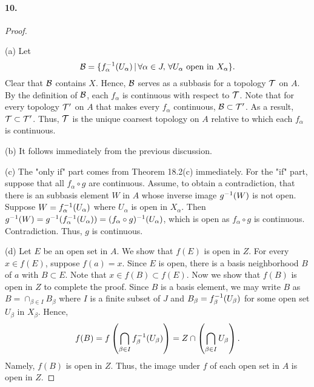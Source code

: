   \paragraph{10.}
  \begin{proof}
    $\,$\par
    (a) Let
    \[
      \mathcal{B}=\{f_\alpha^{-1}(U_\alpha) \,|\, \forall\alpha\in J,\,\forall
      U_\alpha\text{ open in $X_\alpha$}\}.
    \]
    Clear that $\mathcal{B}$ contains $X$. Hence, $\mathcal{B}$ serves as a subbasis
    for a topology $\mathcal{T}$ on $A$. By the definition of $\mathcal{B}$, each
    $f_\alpha$ is continuous with respect to $\mathcal{T}$. Note that for every
    topology $\mathcal{T}^\prime$ on $A$ that makes every $f_\alpha$ continuous, 
    $\mathcal{B}\subset\mathcal{T}^\prime$. As a result, $\mathcal{T}\subset\mathcal{T}^\prime$.
    Thus, $\mathcal{T}$ is the unique coarsest topology on $A$ relative to which
    each $f_\alpha$ is continuous.\par
    (b) It follows immediately from the previous discussion.\par
    (c) The "only if" part comes from Theorem 18.2(c) immediately. For the "if"
    part, suppose that all $f_\alpha\circ g$ are continuous. Assume, to obtain
    a contradiction, that there is an subbasis element $W$ in $A$ whose inverse 
    image $g^{-1}(W)$ is not open. Suppose $W=f_\alpha^{-1}(U_\alpha)$ where 
    $U_\alpha$ is open in $X_\alpha$. Then $g^{-1}(W)=g^{-1}(f_\alpha^{-1}(
    U_\alpha))=(f_\alpha\circ g)^{-1}(U_\alpha)$, which is open as $f_\alpha
    \circ g$ is continuous. Contradiction. Thus, $g$ is continuous.\par
    (d) Let $E$ be an open set in $A$. We show that $f(E)$ is open in $Z$. For
    every $x\in f(E)$, suppose $f(a)=x$. Since $E$ is open, there is a basis
    neighborhood $B$ of $a$ with $B\subset E$. Note that $x\in f(B)\subset
    f(E)$. Now we show that $f(B)$ is open in $Z$ to complete the proof. Since
    $B$ is a basis element, we may write $B$ as $B=\cap_{\beta\in I}B_\beta$
    where $I$ is a finite subset of $J$ and $B_\beta=f_\beta^{-1}(U_\beta)$
    for some open set $U_\beta$ in $X_\beta$. Hence,
    \[
      f(B)=f\left(\bigcap_{\beta\in I}f_\beta^{-1}(U_\beta)\right)=
      Z\cap\left(\bigcap_{\beta\in I}U_\beta\right).
    \]
    Namely, $f(B)$ is open in $Z$. Thus, the image under $f$ of each open set
    in $A$ is open in $Z$.
  \end{proof}





















